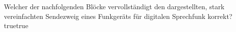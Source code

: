     {Welcher der nachfolgenden Blöcke vervollständigt den dargestellten, stark vereinfachten Sendezweig eines Funkgeräts für digitalen Sprechfunk korrekt?}
    {}
    {}
    {}
    {}
    {true}{true}